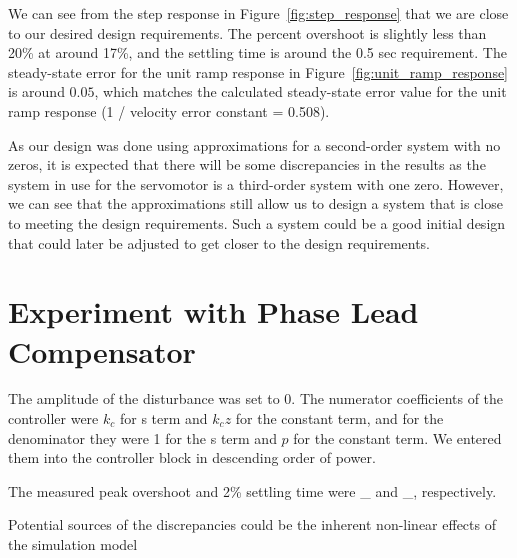 \documentclass[12pt]{article}
\begin{document}
We can see from the step response in Figure~\ref{fig:step_response} that we are close to our desired design requirements. The percent overshoot is slightly less than 20\% at around 17\%, and the settling time is around the 0.5 sec requirement. The steady-state error for the unit ramp response in Figure~\ref{fig:unit_ramp_response} is around $0.05$, which matches the calculated steady-state error value for the unit ramp response (1 / velocity error constant = 0.508). 

As our design was done using approximations for a second-order system with no zeros, it is expected that there will be some discrepancies in the results as the system in use for the servomotor is a third-order system with one zero. However, we can see that the approximations still allow us to design a system that is close to meeting the design requirements. Such a system could be a good initial design that could later be adjusted to get closer to the design requirements.

\section{Experiment with Phase Lead Compensator}
The amplitude of the disturbance was set to 0. The numerator coefficients of the controller were $k_c$ for s term and $k_cz$ for the constant term, and for the denominator they were 1 for the s term and $p$ for the constant term. We entered them into the controller block in descending order of power.

The measured peak overshoot and 2\% settling time were \_ and \_, respectively.

Potential sources of the discrepancies could be the inherent non-linear effects of the simulation model
\end{document}
